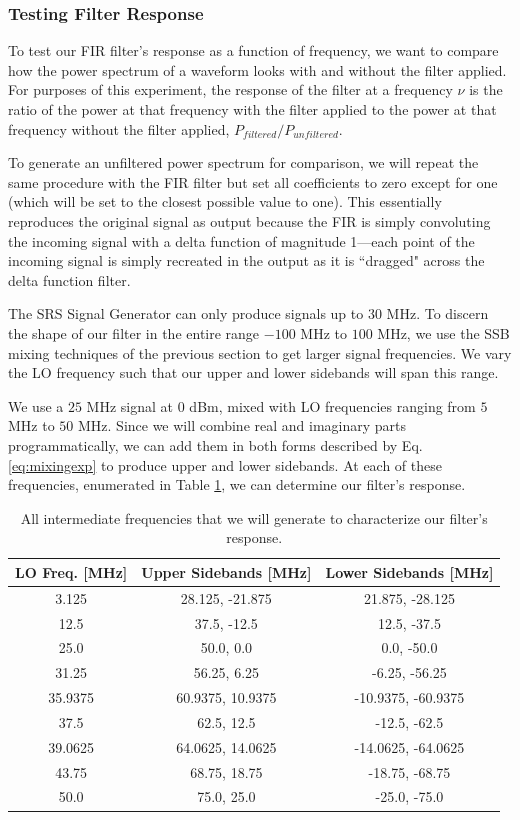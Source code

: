\documentclass[12pt]{article}
\begin{document}
\subsubsection{Testing Filter Response}
To test our FIR filter's response as a function of frequency, we want to compare how the power spectrum of a waveform looks with and without the filter applied. For purposes of this experiment, the response of the filter at a frequency $\nu$ is the ratio of the power at that frequency with the filter applied to the power at that frequency without the filter applied, $P_{filtered}/P_{unfiltered}$.

To generate an unfiltered power spectrum for comparison, we will repeat the same procedure with the FIR filter but set all coefficients to zero except for one (which will be set to the closest possible value to one). This essentially reproduces the original signal as output because the FIR is simply convoluting the incoming signal with a delta function of magnitude 1---each point of the incoming signal is simply recreated in the output as it is ``dragged" across the delta function filter.

The SRS Signal Generator can only produce signals up to $30$ MHz. To discern the shape of our filter in the entire range $-100$ MHz to $100$ MHz, we use the SSB mixing techniques of the previous section to get larger signal frequencies. We vary the LO frequency such that our upper and lower sidebands will span this range.

We use a $25$ MHz signal at $0$ dBm, mixed with LO frequencies ranging from $5$ MHz to $50$ MHz. Since we will combine real and imaginary parts programmatically, we can add them in both forms described by Eq. \ref{eq:mixingexp} to produce upper and lower sidebands. At each of these frequencies, enumerated in Table \ref{tbl:firfrequencies}, we can determine our filter's response.

\begin{table}
\begin{center}
  \begin{tabular}{c | c | c }
    LO Freq. [MHz] & Upper Sidebands [MHz] & Lower Sidebands [MHz] \\ \hline
    3.125 & 28.125, -21.875 & 21.875, -28.125 \\
    12.5 & 37.5, -12.5 & 12.5, -37.5 \\
    25.0 & 50.0, 0.0 & 0.0, -50.0 \\
    31.25 & 56.25, 6.25 & -6.25, -56.25 \\
    35.9375 & 60.9375, 10.9375 & -10.9375, -60.9375 \\
    37.5 & 62.5, 12.5 & -12.5, -62.5 \\
    39.0625 & 64.0625, 14.0625 & -14.0625, -64.0625 \\
    43.75 & 68.75, 18.75 & -18.75, -68.75 \\
    50.0 & 75.0, 25.0 & -25.0, -75.0 \\
    \end{tabular}
\end{center}
\caption{All intermediate frequencies that we will generate to characterize our filter's response.}
\label{tbl:firfrequencies}
\end{table}
\end{document}
